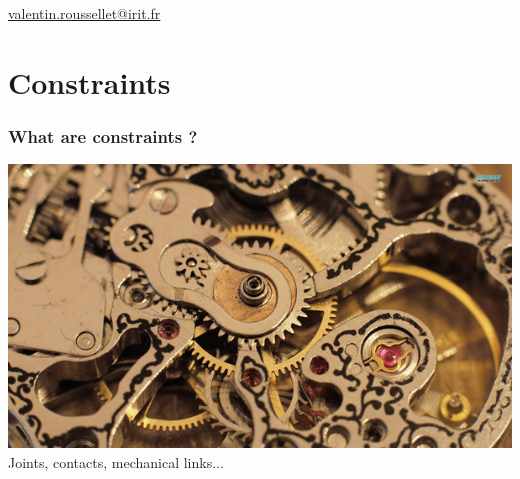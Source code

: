 \documentclass{beamer}
\title{}
\subtitle{}
\author{Charly \textsc{Mourglia} \& Valentin \textsc{Roussellet}}
\institute[IRIT]{IRIT}
\date{\today}
\begin{document}
\begin{frame}
  \titlepage
\begin{center}
\href{mailto:valentin.roussellet@irit.fr}{valentin.roussellet@irit.fr}
\end{center}
\end{frame}

\section{Constraints}
\begin{frame}
 \frametitle{What are constraints ?}
 \includegraphics[width=\textwidth]{watch.png}\\
  Joints, contacts, mechanical links...
\end{frame}
\end{document}
